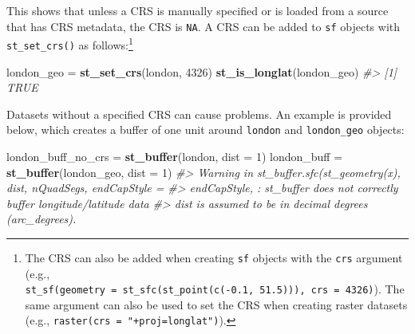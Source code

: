 \documentclass[]{krantz}
\newenvironment{Shaded}{\begin{snugshade}}{\end{snugshade}}
\newcommand{\CommentTok}[1]{\textcolor[rgb]{0.37,0.37,0.37}{\textit{#1}}}
\newcommand{\DataTypeTok}[1]{\textcolor[rgb]{0.27,0.27,0.27}{#1}}
\newcommand{\DecValTok}[1]{\textcolor[rgb]{0.06,0.06,0.06}{#1}}
\newcommand{\FloatTok}[1]{\textcolor[rgb]{0.06,0.06,0.06}{#1}}
\newcommand{\KeywordTok}[1]{\textcolor[rgb]{0.27,0.27,0.27}{\textbf{#1}}}
\newcommand{\NormalTok}[1]{#1}
\newcommand{\OperatorTok}[1]{\textcolor[rgb]{0.43,0.43,0.43}{\textbf{#1}}}
\newcommand{\StringTok}[1]{\textcolor[rgb]{0.5,0.5,0.5}{#1}}
\let\rmarkdownfootnote\footnote%
\def\footnote{\protect\rmarkdownfootnote}
\begin{document}
\begin{Shaded}
\end{Shaded}

This shows that unless a CRS is manually specified or is loaded from a source that has CRS metadata, the CRS is \texttt{NA}.
A CRS can be added to \texttt{sf} objects with \texttt{st\_set\_crs()} as follows:\footnote{The CRS can also be added when creating \texttt{sf} objects with the \texttt{crs} argument (e.g., \texttt{st\_sf(geometry\ =\ st\_sfc(st\_point(c(-0.1,\ 51.5))),\ crs\ =\ 4326)}).
  The same argument can also be used to set the CRS when creating raster datasets (e.g., \texttt{raster(crs\ =\ "+proj=longlat")}).}

\begin{Shaded}
\begin{Highlighting}[]
\NormalTok{london_geo =}\StringTok{ }\KeywordTok{st_set_crs}\NormalTok{(london, }\DecValTok{4326}\NormalTok{)}
\KeywordTok{st_is_longlat}\NormalTok{(london_geo)}
\CommentTok{#> [1] TRUE}
\end{Highlighting}
\end{Shaded}

Datasets without a specified CRS can cause problems.
An example is provided below, which creates a buffer of one unit around \texttt{london} and \texttt{london\_geo} objects:

\begin{Shaded}
\begin{Highlighting}[]
\NormalTok{london_buff_no_crs =}\StringTok{ }\KeywordTok{st_buffer}\NormalTok{(london, }\DataTypeTok{dist =} \DecValTok{1}\NormalTok{)}
\NormalTok{london_buff =}\StringTok{ }\KeywordTok{st_buffer}\NormalTok{(london_geo, }\DataTypeTok{dist =} \DecValTok{1}\NormalTok{)}
\CommentTok{#> Warning in st_buffer.sfc(st_geometry(x), dist, nQuadSegs, endCapStyle =}
\CommentTok{#> endCapStyle, : st_buffer does not correctly buffer longitude/latitude data}
\CommentTok{#> dist is assumed to be in decimal degrees (arc_degrees).}
\end{Highlighting}
\end{Shaded}
\end{document}

